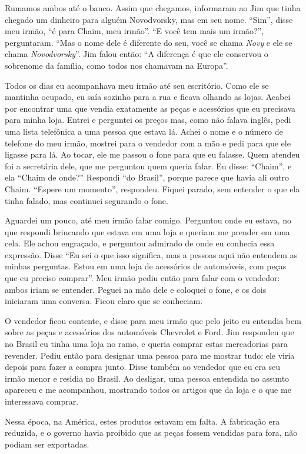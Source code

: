 Rumamos ambos até o banco. Assim que chegamos, informaram ao Jim que tinha
chegado um dinheiro para alguém Novodvorsky, mas em seu nome. ``Sim'',
disse meu irmão, ``é para Chaim, meu irmão''. ``E você tem mais um
irmão?'', perguntaram. ``Mas o nome dele é diferente do seu, você se
chama \textit{Novy} e ele se chama \textit{Novodvorsky}''. Jim falou então: ``A diferença é
que ele conservou o sobrenome da família, como todos nos chamavam na
Europa''.

Todos os dias eu acompanhava meu irmão até seu escritório. Como ele
se mantinha ocupado, eu saía sozinho para a rua e ficava
olhando as lojas. Acabei por encontrar uma que vendia exatamente as peças e
acessórios que eu precisava para minha loja. Entrei e perguntei
os preços mas, como não falava inglês, pedi uma lista telefônica a uma
pessoa que estava lá. Achei o nome e o número de telefone do meu irmão,
mostrei para o vendedor com a mão e pedi para que ele ligasse para lá.
Ao tocar, ele me passou o fone para que eu falasse. Quem
atendeu foi a secretária dele, que me perguntou quem queria
falar. Eu disse: ``Chaim'', e ela ``Chaim de onde?'' Respondi ``do Brasil'', porque
parece que havia ali outro Chaim. ``Espere um momento'', respondeu. Fiquei
parado, sem entender o que ela tinha falado, mas
continuei segurando o fone.

Aguardei um pouco, até meu irmão falar comigo. Perguntou
onde eu estava, no que respondi brincando que estava em uma loja e queriam me
prender em uma cela. Ele achou engraçado, e perguntou admirado de onde eu
conhecia essa expressão. Disse ``Eu sei o que isso significa, mas a
pessoas aqui não entendem as minhas perguntas. Estou em uma loja de
acessórios de automóveis, com peças que eu preciso comprar''. 
Meu irmão pediu então para falar com o vendedor: ambos iriam se entender. 
Peguei na mão dele e coloquei o fone, e os
dois iniciaram uma conversa. Ficou claro que se conheciam.

O vendedor ficou contente, e disse para meu irmão que pelo jeito
eu entendia bem sobre as peças e acessórios dos automóveis Chevrolet e
Ford. Jim respondeu que no Brasil eu tinha uma loja no ramo, e queria
comprar estas mercadorias para revender. Pediu então para designar uma pessoa
para me mostrar tudo: ele viria depois para fazer a compra junto.
Disse também ao vendedor que eu era seu irmão menor e residia no Brasil.
Ao desligar, uma pessoa entendida no assunto apareceu e me acompanhou, mostrando todos os
artigos que da loja e o que me interessava comprar.

Nessa época, na América, estes produtos estavam em falta. A fabricação era
reduzida, e o governo havia proibido que as peças fossem vendidas para
fora, não podiam ser exportadas.

